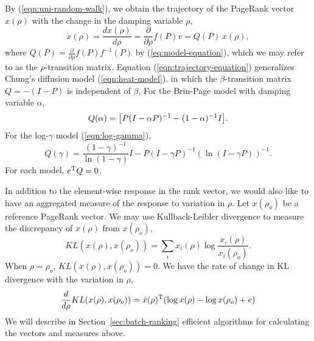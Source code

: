 \documentclass[conference]{IEEEtran}
\let\leftorig\left
\let\rightorig\right
\renewcommand{\left}{\mathopen{}\mathclose\bgroup\leftorig}
\renewcommand{\right}{\aftergroup\egroup\rightorig}
\begin{document}
By (\ref{eqn:uni-random-walk}), we obtain the trajectory of the PageRank
vector $x(\rho)$ with the change in the damping variable $\rho$,
% 
\begin{equation}
\label{eqn:trajectory-equation}
 \dot{x}(\rho) = \frac{d x(\rho)}{d \rho} 
 = \frac{\partial }{\partial \rho}f(P) v = Q(P) \, x(\rho), 
\end{equation}%
%
where $Q(P) = \frac{\partial }{\partial \rho}f(P) f^{-1}(P)$ by
(\ref{eq:model-equation}), which we may refer to as the $\rho$-transition matrix.
%
Equation (\ref{eqn:trajectory-equation}) generalizes Chung's diffusion
model (\ref{eqn:heat-model}), in which the $\beta$-transition matrix
$Q=-(I-P)$ is independent of $\beta$.
%
For the Brin-Page model with damping variable $\alpha$,
%
\begin{equation}
\label{eqn:bp-trajectory-equationpde}
  Q(\alpha) = 
  \left[ P(I - \alpha P)^{-1} - (1-\alpha)^{-1} I\right]. 
\end{equation} 
% 
For the log-$\gamma$ model (\ref{eqn:log-gamma}),  
%
\begin{equation}
\label{eqn:bp-trajectory-equationpde}
   Q(\gamma) =  
   \frac{(1-\gamma)^{-1}}{\ln(1 - \gamma)} I 
         - P(I-\gamma P)^{-1} (\ln(I - \gamma P))^{-1}. 
\end{equation} 
%
For each model, $e^{\rm T}Q=0$. 





In addition to the element-wise response in the rank vector, we would
also like to have an aggregated measure of the response to variation in
$\rho$. Let $x(\rho_{o})$ be a reference PageRank vector.  We
may use Kullback-Leibler divergence \cite{kullback1951information} to measure the discrepancy of
$x(\rho)$ from $x(\rho_{o})$,
%
\begin{equation}
\label{eqn:kl}
  KL(x(\rho), x(\rho_{o}) ) = 
   \sum_{i} x_i(\rho) \log {\frac{x_i(\rho)}{x_i(\rho_{o})}} . 
\end{equation}
%
When $\rho=\rho_{o}$, $KL(x(\rho), x(\rho_{o})) = 0$. 
%
We have the rate of change in KL divergence with the variation in
$\rho$, 
% 
\begin{equation}
\label{eqn:kl-derivative}
  \frac{d}{d \rho} KL(x(\rho), x(\rho_{o})) 
 =  \dot{x}(\rho)^{\rm T} 
    \left( \log {x(\rho)} -\log{x(\rho_{o})}  + e \right)
\end{equation}
%
We will describe in Section~\ref{sec:batch-ranking} efficient
algorithms for calculating the vectors and measures above.
\end{document}
